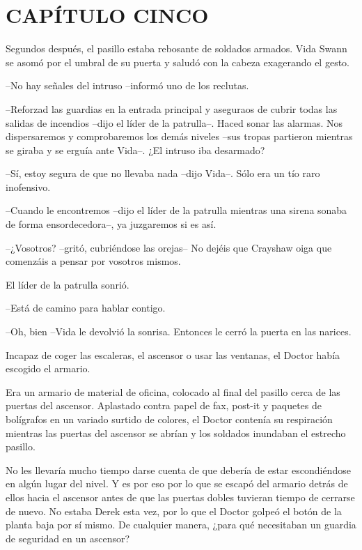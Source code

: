 \chapter*{CAPÍTULO CINCO}

{Segundos después, el pasillo estaba rebosante de soldados armados. Vida
 Swann se asomó por el umbral de su puerta y saludó con la cabeza
exagerando el gesto.}

{--No hay señales del intruso --informó uno de los reclutas.}

{--Reforzad las guardias en la entrada principal y aseguraos de cubrir
 todas las salidas de incendios --dijo el líder de la patrulla--. Haced
 sonar las alarmas. Nos dispersaremos y comprobaremos los demás niveles
 --sus tropas partieron mientras se giraba y se erguía ante Vida--. ¿El
intruso iba desarmado?}

{--Sí, estoy segura de que no llevaba nada --dijo Vida--. Sólo era un
tío raro inofensivo.}

{--Cuando le encontremos --dijo el líder de la patrulla mientras una
sirena sonaba de forma ensordecedora--, ya juzgaremos si es así.}

{--¿Vosotros? --gritó, cubriéndose las orejas-- No dejéis que Crayshaw
oiga que comenzáis a pensar por vosotros mismos.}

{El líder de la patrulla sonrió.}

{--Está de camino para hablar contigo.}

{--Oh, bien --Vida le devolvió la sonrisa. Entonces le cerró la puerta
en las narices.}

\mbox{}

{Incapaz de coger las escaleras, el ascensor o usar las ventanas, el
Doctor había escogido el armario.}

{Era un armario de material de oficina, colocado al final del pasillo
 cerca de las puertas del ascensor. Aplastado contra papel de fax,
 post-it y paquetes de bolígrafos en un variado surtido de colores, el
 Doctor contenía su respiración mientras las puertas del ascensor se
abrían y los soldados inundaban el estrecho pasillo.}

{No les llevaría mucho tiempo darse cuenta de que debería de estar
 escondiéndose en algún lugar del nivel. Y es por eso por lo que se
 escapó del armario detrás de ellos hacia el ascensor antes de que las
 puertas dobles tuvieran tiempo de cerrarse de nuevo. No estaba Derek
 esta vez, por lo que el Doctor golpeó el botón de la planta baja por sí
 mismo. De cualquier manera, ¿para qué necesitaban un guardia de
seguridad en un ascensor?}

